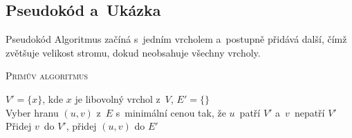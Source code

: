 \documentclass[10pt, hyperref={unicode}]{beamer}[3.5.2020]
\begin{document}
\subsection{Pseudokód a~Ukázka}

\begin{frame}{Pseudokód}
    Algoritmus začíná s~jedním vrcholem a~postupně přidává další, čímž zvětšuje velikost stromu, dokud neobsahuje všechny vrcholy.
    \IncMargin{1.5em}
        \begin{algorithm}[H]
        \caption{\textsc{Primův algoritmus}}
    	\SetNlSty{}{}{:}
    	\SetInd{-0.25em}{1em}
    
    	\Indm\Indmm
    	\Indp\Indpp
    	\BlankLine
    
    	$V' = \{x\}$, kde $x$ je libovolný vrchol z~$V$, $E' = \{\}$ \\
    	 {Vyber hranu $(u,v)$ z~$E$ s~minimální cenou tak, že $u$~patří $V'$ a~$v$~nepatří $V'$
    	\\ Přidej $v$~do $V'$, přidej $(u,v)$ do $E'$}
        \end{algorithm}
    \DecMargin{1.5em}
\end{frame}
\end{document}
